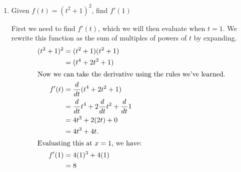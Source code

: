 \documentclass{article}
\begin{document}
\begin{enumerate}[resume]
\begin{enumerate}
  \item
    \begin{problem}[\vfill]
      Given $f(t) = (t^2 + 1)^2$, find $f'(1)$
    \end{problem}

    \begin{solution}
      First we need to find $f'(t)$, which we will then evaluate when $t=1$. We rewrite this function as the sum of multiples of powers of $t$ by expanding.
      \begin{align*}
        (t^2 + 1)^2 &= (t^2 + 1)(t^2 + 1) \\
        &= (t^4 + 2t^2 + 1) \\
        \intertext{Now we can take the derivative using the rules we've learned.}
        f'(t) &= \frac{d}{dt} (t^4 + 2t^2 + 1) \\
        &= \frac{d}{dt} t^4 + 2\frac{d}{dt} t^2 + \frac{d}{dt} 1 \\
        &= 4t^3 + 2(2t) + 0 \\
        &= 4t^3 + 4t.\\
        \intertext{Evaluating this at $x=1$, we have:}
        f'(1) &= 4(1)^3 + 4(1)\\
        &= 8
      \end{align*}
      
    \end{solution}

  \end{enumerate}

\end{enumerate}
\end{document}
